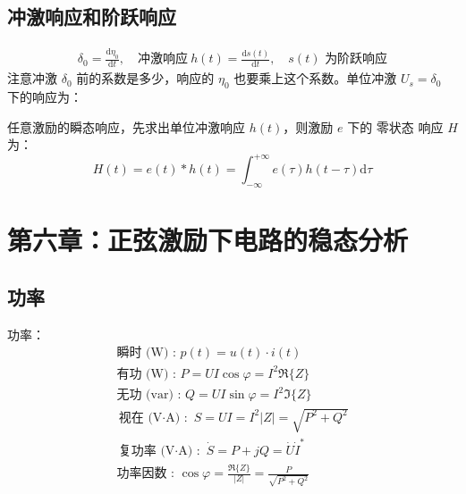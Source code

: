 \documentclass[a4paper]{article}  %
\theoremstyle{MyLineTheoremStyle} %
\theoremstyle{MyBlockTheoremStyle} %
\theoremstyle{MySubsubsectionStyle} %
\begin{document}
\begin{multicols*}{4}
\subsection{冲激响应和阶跃响应}
\begin{gather}
    \delta_0 = \frac{\mathrm{d} \eta_0 }{\mathrm{d} t } ,\quad 
    \text{冲激响应}\  h(t) = \frac{\mathrm{d} s(t)}{\mathrm{d} t},\quad s(t) \text{\ 为阶跃响应}
\end{gather}
注意冲激 $\delta_0$ 前的系数是多少，响应的 $\eta_0$ 也要乘上这个系数。单位冲激 $U_s = \delta_0$ 下的响应为：
\begin{table}[H]\centering
{}
\end{table}
任意激励的瞬态响应，先求出单位冲激响应 $h(t)$，则激励 $e$ 下的 {\color{red} 零状态} 响应 $H$ 为：
\begin{equation}
H(t) = e(t) * h(t) = \int_{-\infty}^{+\infty} e(\tau)h(t - \tau) \mathrm{d} \tau
\end{equation}


\section{第六章：正弦激励下电路的稳态分析}

\subsection{功率}

功率：
\begin{gather}
\text{瞬时 (W) : \ } p(t) = u(t) \cdot i(t) \\
\text{有功 (W) : \ } P = UI \cos \varphi = I^2 \Re \{Z\} \\ 
\text{无功 (var) : \ } Q = UI \sin \varphi = I^2 \Im \{Z\} \\
\text{视在 (V$\cdot$A) : \ } S = UI = I^2 |Z| = \sqrt{P^2 + Q^2} \\ 
\text{复功率 (V$\cdot$A) : \ } \dot{S} = P + jQ = \dot{U}\dot{I}^*\\
\text{功率因数 : \ } \cos \varphi = \frac{\Re \{Z\}}{|Z|} = \frac{P}{\sqrt{P^2 + Q^2}} 
\end{gather}


\end{multicols*}
\end{document}
